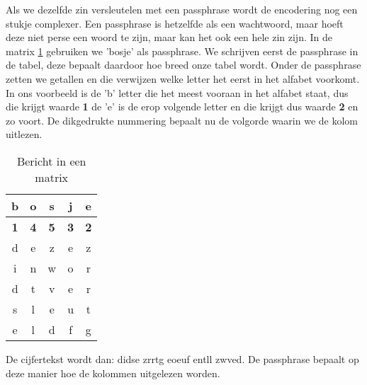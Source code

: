 Als we dezelfde zin versleutelen met een passphrase wordt de encodering nog een stukje complexer. Een passphrase is hetzelfde als een wachtwoord, maar hoeft deze niet perse een woord te zijn, maar kan het ook een hele zin zijn. In de matrix \ref{tab:matrix_passphrase} gebruiken we 'bosje' als passphrase. We schrijven eerst de passphrase in de tabel, deze bepaalt daardoor hoe breed onze tabel wordt. Onder de passphrase zetten we getallen en die verwijzen welke letter het eerst in het alfabet voorkomt. In ons voorbeeld is de 'b' letter die het meest vooraan in het alfabet staat, dus die krijgt waarde \textbf{1} de 'e' is de erop volgende letter en die krijgt dus waarde \textbf{2} en zo voort. De dikgedrukte nummering bepaalt nu de volgorde waarin we de kolom uitlezen.
\begin{table}[h]
\centering
\begin{tabular}{|c|c|c|c|c|}
\hline
	b &
	o &
	s &
	j &
	e \\
\hline
	\textbf{1} &
	\textbf{4} &
	\textbf{5} &
	\textbf{3} &
	\textbf{2} \\

\hline
\hline
	d &
	e &
	z &
	e &
	z \\
\hline
	i &
	n &
	w &
	o &
	r \\
\hline
	d &
	t &
	v &
	e &
	r \\
\hline
	s &
	l &
	e &
	u &
	t \\
\hline
	e &
	l &
	d &
	f &
	g \\
\hline
\end{tabular}
\caption{Bericht in een matrix}
\label{tab:matrix_passphrase}
\end{table}
De cijfertekst wordt dan: didse zrrtg eoeuf entll zwved. De passphrase bepaalt op deze manier hoe de kolommen uitgelezen worden.
